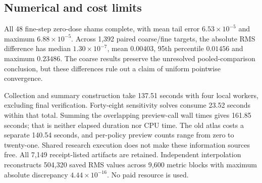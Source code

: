 \subsection{Numerical and cost limits}
All 48 fine-step zero-dose shams complete, with mean tail error $6.53\times10^{-5}$ and maximum $6.88\times10^{-5}$. Across 1,392 paired coarse/fine targets, the absolute RMS difference has median $1.30\times10^{-7}$, mean $0.00403$, 95th percentile $0.01456$ and maximum $0.23486$. The coarse results preserve the unresolved pooled-comparison conclusion, but these differences rule out a claim of uniform pointwise convergence.

Collection and summary construction take 137.51 seconds with four local workers, excluding final verification. Forty-eight sensitivity solves consume 23.52 seconds within that total. Summing the overlapping preview-call wall times gives 161.85 seconds; that is neither elapsed duration nor CPU time. The old atlas costs a separate 140.54 seconds, and per-policy preview counts range from zero to twenty-one. Shared research execution does not make these information sources free. All 7,149 receipt-listed artifacts are retained. Independent interpolation reconstructs 504,320 saved RMS values across 9,600 metric blocks with maximum absolute discrepancy $4.44\times10^{-16}$. No paid resource is used.
